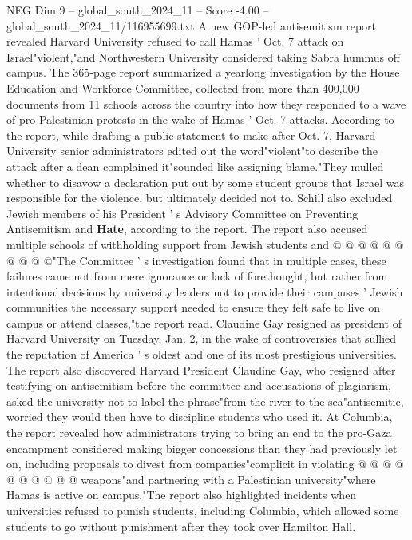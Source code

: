 \begin{textsample}{NEG Dim 9 – global\_south\_2024\_11 – Score -4.00 – global\_south\_2024\_11/116955699.txt}  \label{ex:f9_neg_413}
A new GOP-led antisemitism report revealed Harvard University refused to call Hamas ' Oct. 7 attack on Israel"violent,"and Northwestern University considered taking Sabra hummus off campus.
The 365-page report summarized a yearlong investigation by the House Education and Workforce Committee, collected from more than 400,000 documents from 11 schools across the country into how they responded to a wave of pro-Palestinian protests in the wake of Hamas ' Oct. 7 attacks.
According to the report, while drafting a public statement to make after Oct. 7, Harvard University senior administrators edited out the word"violent"to describe the attack after a dean complained it"sounded like assigning blame."They mulled whether to disavow a declaration put out by some student groups that Israel was responsible for the violence, but ultimately decided not to.
Schill also excluded Jewish members of his President ' s Advisory Committee on Preventing Antisemitism and \textbf{Hate}, according to the report.
The report also accused multiple schools of withholding support from Jewish students and @ @ @ @ @ @ @ @ @ @"The Committee ' s investigation found that in multiple cases, these failures came not from mere ignorance or lack of forethought, but rather from intentional decisions by university leaders not to provide their campuses ' Jewish communities the necessary support needed to ensure they felt safe to live on campus or attend classes,"the report read.
Claudine Gay resigned as president of Harvard University on Tuesday, Jan. 2, in the wake of controversies that sullied the reputation of America ' s oldest and one of its most prestigious universities.
The report also discovered Harvard President Claudine Gay, who resigned after testifying on antisemitism before the committee and accusations of plagiarism, asked the university not to label the phrase"from the river to the sea"antisemitic, worried they would then have to discipline students who used it.
At Columbia, the report revealed how administrators trying to bring an end to the pro-Gaza encampment considered making bigger concessions than they had previously let on, including proposals to divest from companies"complicit in violating @ @ @ @ @ @ @ @ @ @ weapons"and partnering with a Palestinian university"where Hamas is active on campus."The report also highlighted incidents when universities refused to punish students, including Columbia, which allowed some students to go without punishment after they took over Hamilton Hall.

\end{textsample}
